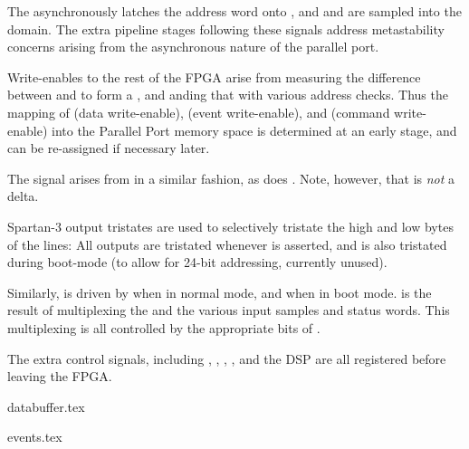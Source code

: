 The  asynchronously latches the address word onto
, and  and  are sampled into
the  domain. The extra pipeline stages following these
signals address metastability concerns arising from the asynchronous
nature of the parallel port.
  
Write-enables to the rest of the FPGA arise from measuring the
difference between  and  to form a
, and anding that with various address checks. Thus
the mapping of  (data write-enable),  (event
write-enable), and  (command write-enable) into the
Parallel Port memory space is determined at an early stage, and can be
re-assigned if necessary later.
    
The signal  arises from  in a similar
fashion, as does . Note, however, that  is
\textit{not} a delta.
  
Spartan-3 output tristates are used to selectively tristate the high
and low bytes of the  lines: All outputs are tristated
whenever  is asserted, and  is also
tristated during boot-mode (to allow for 24-bit addressing, currently
unused).
  
Similarly,  is driven by  when in
normal mode, and  when in boot mode. is
the result of multiplexing the  and the various
input samples and status words. This multiplexing is all controlled by
the appropriate bits of .


The extra control signals, including , ,
, , and the DSP  are all
registered before leaving the FPGA.
    

{databuffer.tex}

{events.tex}

